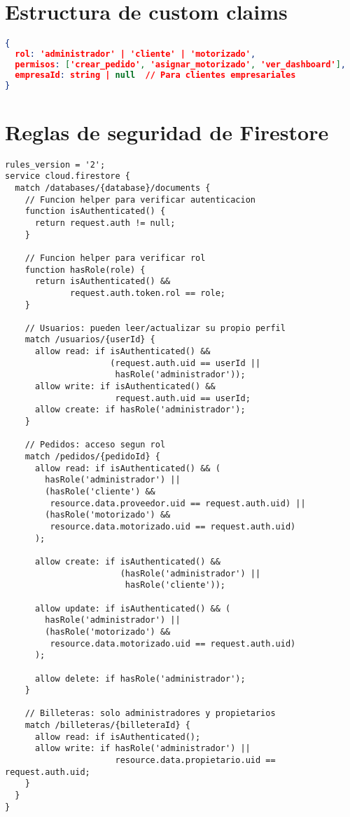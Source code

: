 \section{Estructura de custom claims}

\begin{lstlisting}[language=json,caption={Custom claims en Firebase Authentication}]
{
  rol: 'administrador' | 'cliente' | 'motorizado',
  permisos: ['crear_pedido', 'asignar_motorizado', 'ver_dashboard'],
  empresaId: string | null  // Para clientes empresariales
}
\end{lstlisting}

\section{Reglas de seguridad de Firestore}

\begin{lstlisting}[caption={Firestore Security Rules}]
rules_version = '2';
service cloud.firestore {
  match /databases/{database}/documents {
    // Funcion helper para verificar autenticacion
    function isAuthenticated() {
      return request.auth != null;
    }
    
    // Funcion helper para verificar rol
    function hasRole(role) {
      return isAuthenticated() && 
             request.auth.token.rol == role;
    }
    
    // Usuarios: pueden leer/actualizar su propio perfil
    match /usuarios/{userId} {
      allow read: if isAuthenticated() && 
                     (request.auth.uid == userId || 
                      hasRole('administrador'));
      allow write: if isAuthenticated() && 
                      request.auth.uid == userId;
      allow create: if hasRole('administrador');
    }
    
    // Pedidos: acceso segun rol
    match /pedidos/{pedidoId} {
      allow read: if isAuthenticated() && (
        hasRole('administrador') ||
        (hasRole('cliente') && 
         resource.data.proveedor.uid == request.auth.uid) ||
        (hasRole('motorizado') && 
         resource.data.motorizado.uid == request.auth.uid)
      );
      
      allow create: if isAuthenticated() && 
                       (hasRole('administrador') || 
                        hasRole('cliente'));
      
      allow update: if isAuthenticated() && (
        hasRole('administrador') ||
        (hasRole('motorizado') && 
         resource.data.motorizado.uid == request.auth.uid)
      );
      
      allow delete: if hasRole('administrador');
    }
    
    // Billeteras: solo administradores y propietarios
    match /billeteras/{billeteraId} {
      allow read: if isAuthenticated();
      allow write: if hasRole('administrador') || 
                      resource.data.propietario.uid == request.auth.uid;
    }
  }
}
\end{lstlisting}


